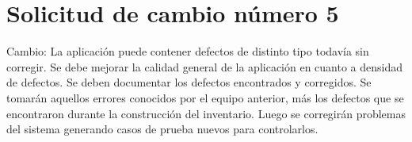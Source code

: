 \section{Solicitud de cambio número 5}
Cambio: La aplicación puede contener defectos de distinto tipo todavía sin corregir. Se debe
mejorar la calidad general de la aplicación en cuanto a densidad de defectos. Se
deben documentar los defectos encontrados y corregidos.
Se tomarán aquellos errores conocidos por el equipo anterior, más los defectos que se encontraron durante la construcción del inventario. Luego se corregirán problemas del sistema generando casos de prueba nuevos para controlarlos.

